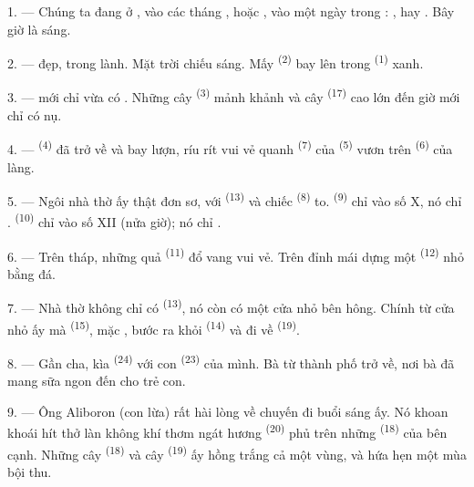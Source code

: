 \VUsaut{3.0mm}

1. --- Chúng ta đang ở , vào các tháng ,  hoặc
, vào một ngày trong  : ,  hay
. Bây giờ là  sáng.

2. ---  đẹp,  trong lành. Mặt trời chiếu sáng. Mấy
 \textsuperscript{(2)} bay lên trong 
\textsuperscript{(1)} xanh.

3. ---  mới chỉ vừa có . Những cây 
\textsuperscript{(3)} mảnh khảnh và cây  \textsuperscript{(17)} cao
lớn đến giờ mới chỉ có nụ.

4. ---  \textsuperscript{(4)} đã trở về và bay lượn, ríu rít vui vẻ
quanh  \textsuperscript{(7)} của 
\textsuperscript{(5)} vươn trên  \textsuperscript{(6)} của làng.

\VUsaut{3.4mm}
\VUsaut{3.0mm}

5. --- Ngôi nhà thờ ấy thật đơn sơ, với  \textsuperscript{(13)} và
chiếc  \textsuperscript{(8)} to. 
\textsuperscript{(9)} chỉ vào số X, nó chỉ . 
\textsuperscript{(10)} chỉ vào số XII (nửa giờ); nó chỉ .

6. --- Trên tháp, những quả  \textsuperscript{(11)} đổ vang vui vẻ. Trên
đỉnh mái dựng một  \textsuperscript{(12)} nhỏ bằng đá.

7. --- Nhà thờ không chỉ có  \textsuperscript{(13)}, nó còn có một cửa
nhỏ bên hông. Chính từ cửa nhỏ ấy mà  \textsuperscript{(15)}, mặc
, bước ra khỏi  \textsuperscript{(14)} và đi về
 \textsuperscript{(19)}.

8. --- Gần cha, kìa  \textsuperscript{(24)} với con 
\textsuperscript{(23)} của mình. Bà từ thành phố trở về, nơi bà đã mang sữa ngon đến cho
trẻ con.

\VUsaut{4.0mm}
\VUsaut{3.4mm}

9. --- Ông Aliboron (con lừa) rất hài lòng về chuyến đi buổi sáng ấy. Nó khoan khoái
hít thở làn không khí thơm ngát hương  \textsuperscript{(20)} phủ trên những
 \textsuperscript{(18)} của  bên cạnh. Những cây
 \textsuperscript{(18)} và cây  \textsuperscript{(19)} ấy hồng
trắng cả một vùng, và hứa hẹn một mùa bội thu.

